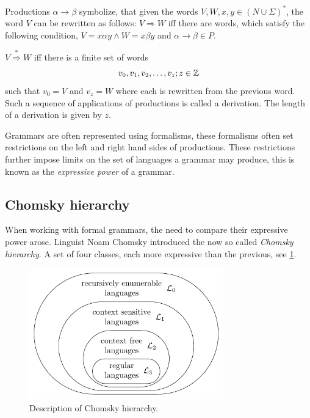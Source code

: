 Productions $\alpha \rightarrow \beta$ symbolize, that given the words $V,W,x,y \in \left( N \cup \Sigma \right)^{*}$, the word $V$ can be rewritten as follows:
$V \Rightarrow W$ iff there are words, which satisfy the following condition, $V=x\alpha y \wedge W=x\beta y$ and $\alpha \rightarrow \beta \in P$.

\begin{definition}[Derivation]
\label{def:derivation}
$V \stackrel{*}{\Rightarrow}  W$ iff there is a finite set of words 
$$ v_0, v_1, v_2, \dots, v_z;\medskip z \in \mathbb{Z}$$
such that $v_0 = V$ and $v_z = W$ where each is rewritten from the previous word. Such a sequence of applications of productions is called a derivation.
The length of a derivation is given by $z$. 
\end{definition}

Grammars are often represented using formalisms, these formalisms often set restrictions on the left and right hand sides of productions. These restrictions further impose limits on the set of languages a grammar may produce, this is known as the \emph{expressive power} of a grammar. 

\subsection{Chomsky hierarchy}
When working with formal grammars, the need to compare their expressive power arose. Linguist Noam Chomsky introduced the now so called \emph{Chomsky hierarchy}\cite{chomsky1956three}. A set of four classes, each more expressive than the previous, see \cref{fig:chomsky-hierarchy}.



\begin{figure}[h]
  \caption{Description of Chomsky hierarchy.}
  \label{fig:chomsky-hierarchy}
  \centering
  \includegraphics[width=0.75\textwidth]{figures/chomsky-hierarchy.pdf}
\end{figure}

